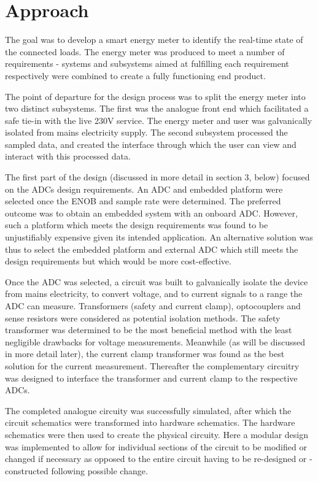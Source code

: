 
\section{Approach}
The goal was to develop a smart energy meter to identify the real-time state of the connected loads. The energy meter was produced to meet a number of requirements -  systems and subsystems aimed at fulfilling each requirement respectively were combined to create a fully functioning end product.
\par
The point of departure for the design process was to split the energy meter into two distinct subsystems. The first was the analogue front end which facilitated a safe tie-in with the live 230V service. The energy meter and user was galvanically isolated from mains electricity supply. The second subsystem processed the sampled data, and created the interface through which the user can view and interact with this processed data.
\par 
The first part of the design (discussed in more detail in section 3, below) focused on the ADCs design requirements. 
An ADC and embedded platform were selected once the ENOB and sample rate were determined. The preferred outcome was to obtain an embedded system with an onboard ADC. However, such a platform which meets the design requirements was found to be unjustifiably expensive given its intended application. An alternative solution was thus to select the embedded platform and external ADC which still meets the design requirements but which would be more cost-effective.
\par
Once the ADC was selected, a circuit was built to galvanically isolate the device from mains electricity, to convert voltage, and to current signals to a range the ADC can measure.
Transformers (safety and current clamp), optocouplers and sense resistors were considered as potential isolation methods. The safety transformer was determined to be the most beneficial method with the least negligible drawbacks for voltage measurements. Meanwhile (as will be discussed in more detail later), the current clamp transformer was found as the best solution for the current measurement. Thereafter the complementary circuitry was designed to interface the transformer and current clamp to the respective ADCs.
\par
The completed analogue circuity was successfully simulated, after which the circuit schematics were transformed into hardware schematics. The hardware schematics were then used to create the physical circuity. Here a modular design was implemented to allow for individual sections of the circuit to be modified or changed if necessary as opposed to the entire circuit having to be re-designed or -constructed following possible change.
